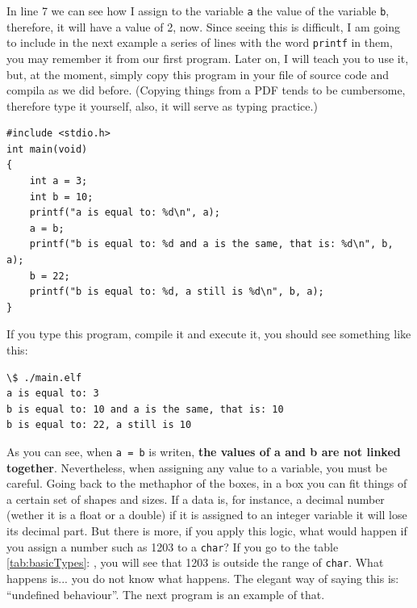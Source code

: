 \documentclass[a4paper]{article}
\begin{document}
In line 7 we can see how I assign to the variable \verb"a" the value of the
variable \verb!b!, therefore, it will have a value of 2, now. Since seeing this
is difficult, I am going to include in the next example a series of lines with
the word \verb!printf! in them, you may remember it from our first program.
Later on, I will teach you to use it, but, at the moment, simply copy this
program in your file of source code and compila as we did before. (Copying
things from a PDF tends to be cumbersome, therefore type it yourself, also, it
will serve as typing practice.)

\noindent
\begin{minipage}[H]{\linewidth}
\mbox{}
\begin{lstlisting}[style=C, caption={Final example of variable using},
label={lst:variableFinalExample}]
#include <stdio.h>
int main(void)
{
    int a = 3;
    int b = 10;
    printf("a is equal to: %d\n", a);
    a = b;
    printf("b is equal to: %d and a is the same, that is: %d\n", b, a);
    b = 22;
    printf("b is equal to: %d, a still is %d\n", b, a);
}
\end{lstlisting}
\end{minipage}

If you type this program, compile it and execute it, you should see something
like this:

\noindent
\begin{minipage}[H]{\linewidth}
\mbox{}
\begin{lstlisting}[style=terminalStyle]
\$ ./main.elf
a is equal to: 3
b is equal to: 10 and a is the same, that is: 10
b is equal to: 22, a still is 10
\end{lstlisting}
\end{minipage}

As you can see, when \verb!a = b! is writen, \textbf{the values of a and b are
not linked together}. Nevertheless, when assigning any value to a variable, you
must be careful. Going back to the methaphor of the boxes, in a box you can fit
things of a certain set of shapes and sizes. If a data is, for instance, a
decimal number (wether it is a float or a double) if it is assigned to an
integer variable it will lose its decimal part. But there is more, if you apply
this logic, what would happen if you assign a number such as 1203 to a
\verb!char!? If you go to the table \ref{tab:basicTypes}:
, you will see that 1203 is outside the range of
\verb!char!. What happens is... you do not know what happens. The elegant way of
saying this is: ``undefined behaviour''. The next program is an example of that.
\end{document}
